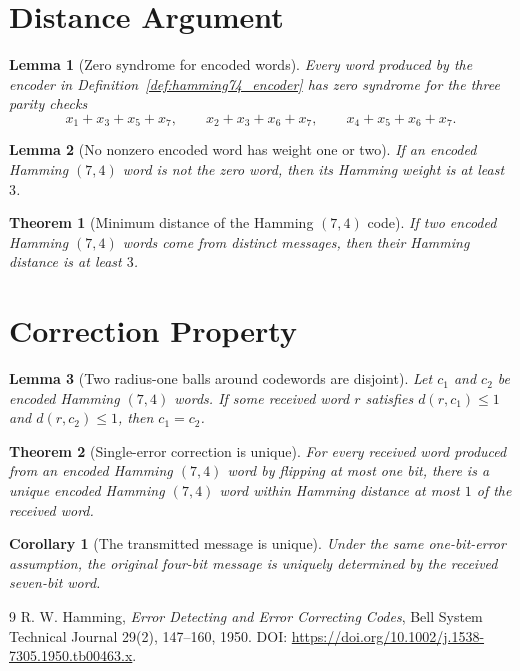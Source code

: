 \documentclass{article}
\newtheorem{lemma}{Lemma}
\newtheorem{theorem}{Theorem}
\newtheorem{corollary}{Corollary}
\begin{document}
\section{Distance Argument}

\begin{lemma}[Zero syndrome for encoded words]\label{lem:encoded_syndrome_zero}
Every word produced by the encoder in Definition~\ref{def:hamming74_encoder}
has zero syndrome for the three parity checks
\[
  x_1+x_3+x_5+x_7,\qquad
  x_2+x_3+x_6+x_7,\qquad
  x_4+x_5+x_6+x_7.
\]
\end{lemma}

\begin{lemma}[No nonzero encoded word has weight one or two]\label{lem:no_small_nonzero_codeword}
If an encoded Hamming $(7,4)$ word is not the zero word, then its Hamming
weight is at least $3$.
\end{lemma}

\begin{theorem}[Minimum distance of the Hamming $(7,4)$ code]\label{thm:hamming74_min_distance}
If two encoded Hamming $(7,4)$ words come from distinct messages, then their
Hamming distance is at least $3$.
\end{theorem}

\section{Correction Property}

\begin{lemma}[Two radius-one balls around codewords are disjoint]\label{lem:radius_one_balls_disjoint}
Let $c_1$ and $c_2$ be encoded Hamming $(7,4)$ words.  If some received word
$r$ satisfies $d(r,c_1)\le 1$ and $d(r,c_2)\le 1$, then $c_1=c_2$.
\end{lemma}

\begin{theorem}[Single-error correction is unique]\label{thm:single_error_correction_unique}
For every received word produced from an encoded Hamming $(7,4)$ word by
flipping at most one bit, there is a unique encoded Hamming $(7,4)$ word within
Hamming distance at most $1$ of the received word.
\end{theorem}

\begin{corollary}[The transmitted message is unique]\label{cor:message_unique}
Under the same one-bit-error assumption, the original four-bit message is
uniquely determined by the received seven-bit word.
\end{corollary}

\begin{thebibliography}{9}
R. W. Hamming,
\emph{Error Detecting and Error Correcting Codes},
Bell System Technical Journal 29(2), 147--160, 1950.
DOI: \url{https://doi.org/10.1002/j.1538-7305.1950.tb00463.x}.
\end{thebibliography}
\end{document}
